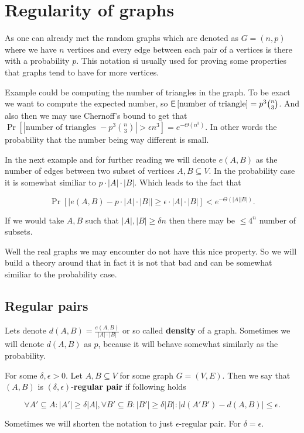 \chapter{Regularity of graphs}

As one can already met the random graphs which are denoted as $G = (n,p)$ where we have $n$ vertices and every edge between each pair of a vertices is there with a probability $p$. This notation si usually used for proving some properties that graphs tend to have for more vertices.

Example could be computing the number of triangles in the graph. To be exact we want to compute the expected number, so $\operatorname{\textsf{E}\,} [\text{number of triangle}] = p^3 \binom{n}{3}$. And also then we may use Chernoff's bound to get that $\Pr \left[|\text{number of triangles } - p^3 \binom{n}{3}| > \epsilon n^3\right] = e^{-\Theta(n^3)}$. In other words the probability that the number being way different is small.

In the next example and for further reading we will denote $e(A,B)$ as the number of edges between two subset of vertices $A, B \subseteq V$. In the probability case it is somewhat similiar to $p \cdot |A| \cdot |B|$. Which leads to the fact that

$$
\Pr \left[\left|e(A,B) - p \cdot |A| \cdot |B|\right| \geq \epsilon \cdot |A|\cdot |B| \right] < e^{-\Theta(|A||B|)}.
$$

If we would take $A, B$ such that $|A|, |B| \geq \delta n$ then there may be $\leq 4^n$ number of subsets.

Well the real graphs we may encounter do not have this nice property. So we will build a theory around that in fact it is not that bad and can be somewhat similiar to the probability case.

\section{Regular pairs}

\begin{defn}
	Lets denote $d(A,B) = \frac{e(A,B)}{|A| \cdot |B|}$ or so called \textbf{density} of a graph. Sometimes we will denote $d(A,B)$ as $p$, because it will behave somewhat similarly as the probability.
\end{defn}

\begin{defn}
	For some $\delta, \epsilon > 0$. Let $A, B \subseteq V$ for some graph $G = (V,E)$. Then we say that $(A,B)$ is $(\delta, \epsilon)$-\textbf{regular pair} if following holds
	
	$$
	\forall A' \subseteq A : |A'| \geq \delta |A|, \forall B' \subseteq B : |B'| \geq \delta |B| : |d(A'B') - d(A,B)| \leq \epsilon.
	$$
	
	Sometimes we will shorten the notation to just $\epsilon$-regular pair. For $\delta = \epsilon$.
\end{defn}

